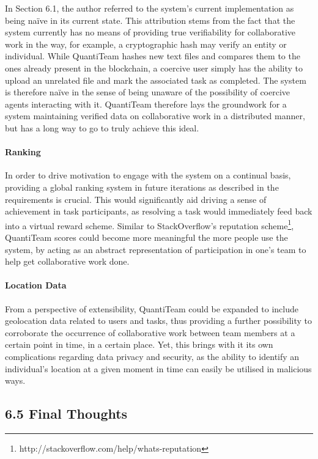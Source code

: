 \documentclass[12pt]{report}
\let\oldparagraph\paragraph
\renewcommand{\paragraph}[1]{\oldparagraph{#1}\mbox{}}
\begin{document}
In Section 6.1, the author referred to the system's current
implementation as being naïve in its current state. This attribution
stems from the fact that the system currently has no means of providing
true verifiability for collaborative work in the way, for example, a
cryptographic hash may verify an entity or individual. While QuantiTeam
hashes new text files and compares them to the ones already present in
the blockchain, a coercive user simply has the ability to upload an
unrelated file and mark the associated task as completed. The system is
therefore naïve in the sense of being unaware of the possibility of
coercive agents interacting with it. QuantiTeam therefore lays the
groundwork for a system maintaining verified data on collaborative work
in a distributed manner, but has a long way to go to truly achieve this
ideal.

\paragraph{Ranking}\label{ranking}

In order to drive motivation to engage with the system on a continual
basis, providing a global ranking system in future iterations as
described in the requirements is crucial. This would significantly aid
driving a sense of achievement in task participants, as resolving a task
would immediately feed back into a virtual reward scheme. Similar to
StackOverflow's reputation
scheme\footnote{http://stackoverflow.com/help/whats-reputation}, QuantiTeam scores could become more meaningful the more
people use the system, by acting as an abstract representation of
participation in one's team to help get collaborative work done.

\paragraph{Location Data}\label{location-data}

From a perspective of extensibility, QuantiTeam could be expanded to
include geolocation data related to users and tasks, thus providing a
further possibility to corroborate the occurrence of collaborative work
between team members at a certain point in time, in a certain place.
Yet, this brings with it its own complications regarding data privacy
and security, as the ability to identify an individual's location at a
given moment in time can easily be utilised in malicious ways.

\subsection{6.5 Final Thoughts}\label{final-thoughts}
\end{document}

